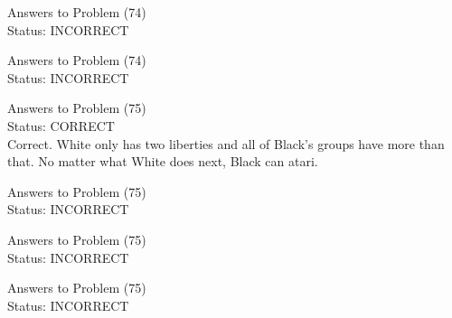 \documentclass[11pt]{article}
\begin{document}
\begin{minipage}[t]{0.5\textwidth}
  {\centering
  
  Answers to Problem (74)\\
  Status: INCORRECT\\
  
  }
\end{minipage}
\begin{minipage}[t]{0.5\textwidth}
  {\centering
  
  Answers to Problem (74)\\
  Status: INCORRECT\\
  
  }
\end{minipage}
\begin{minipage}[t]{0.5\textwidth}
  {\centering
  
  Answers to Problem (75)\\
  Status: CORRECT\\
  Correct. White only has two liberties and all of Black's groups have more than that. No matter what White does next, Black can atari.\\
  }
\end{minipage}
\begin{minipage}[t]{0.5\textwidth}
  {\centering
  
  Answers to Problem (75)\\
  Status: INCORRECT\\
  
  }
\end{minipage}
\begin{minipage}[t]{0.5\textwidth}
  {\centering
  
  Answers to Problem (75)\\
  Status: INCORRECT\\
  
  }
\end{minipage}
\begin{minipage}[t]{0.5\textwidth}
  {\centering
  
  Answers to Problem (75)\\
  Status: INCORRECT\\
  
  }
\end{minipage}
\end{document}
